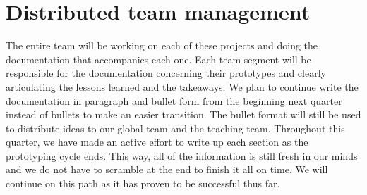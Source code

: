 

\section{Distributed team management}
The entire team will be working on each of these projects and doing the documentation that accompanies each one.  Each team segment will be responsible for the documentation concerning their prototypes and clearly articulating the lessons learned and the takeaways. We plan to continue write the documentation in paragraph and bullet form from the beginning next quarter instead of bullets to make an easier transition.  The bullet format will still be used to distribute ideas to our global team and the teaching team. Throughout this quarter, we have made an active effort to write up each section as the prototyping cycle ends. This way, all of the information is still fresh in our minds and we do not have to scramble at the end to finish it all on time. We will continue on this path as it has proven to be successful thus far. 



